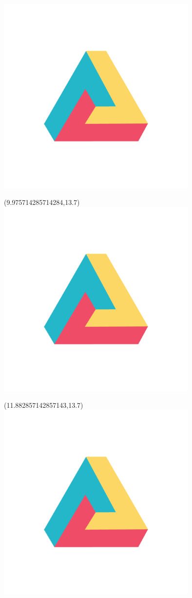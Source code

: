 \documentclass[22pt]{beamer}
\begin{document}
\begin{frame}[fragile]
\begin{textblock}{2}
\includegraphics[height=10cm]{dh.png} 
\end{textblock}
\begin{textblock}{2}(9.975714285714284,13.7)
\includegraphics[height=10cm]{dh.png} 
\end{textblock}
\begin{textblock}{2}(11.882857142857143,13.7)
\includegraphics[height=10cm]{dh.png} 

\end{textblock}
\end{frame}
\end{document}
